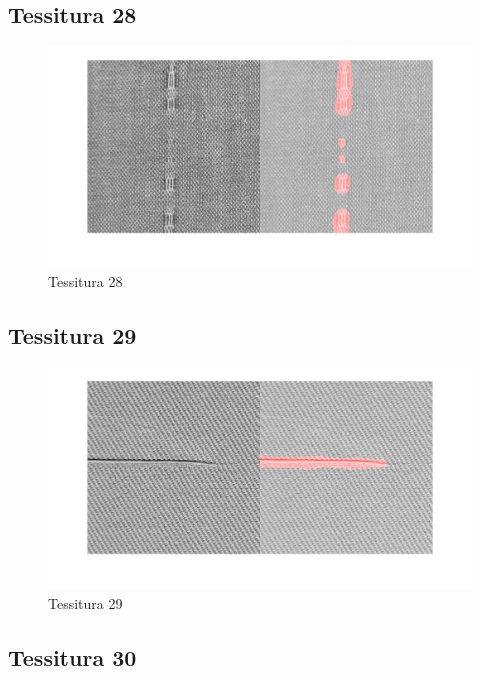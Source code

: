 \documentclass{article}
\begin{document}
\subsection{Tessitura 28}

\begin{figure}[h!]
	\centering
	\includegraphics[width=\textwidth]{results/res28.jpg}
	\caption{Tessitura 28}
\end{figure}

\newpage
\subsection{Tessitura 29}

\begin{figure}[h!]
	\centering
	\includegraphics[width=\textwidth]{results/res29.jpg}
	\caption{Tessitura 29}
\end{figure}


\subsection{Tessitura 30}
\end{document}

